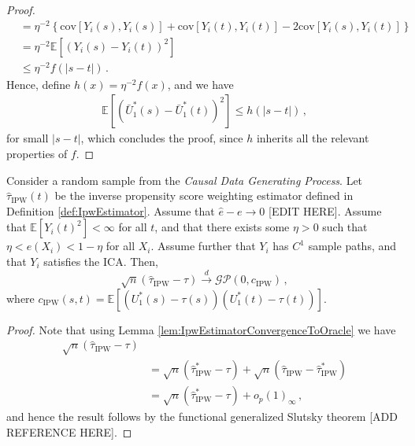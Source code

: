 \begin{proof}
\begin{align}
        &= \eta^{-2} \left\{ \mathrm{cov}[Y_i(s), Y_i(s)] + \mathrm{cov}[Y_i(t), Y_i(t)] - 2 \mathrm{cov}[Y_i(s), Y_i(t)] \right\} \\
        &= \eta^{-2} \mathbb{E}\left[(Y_i(s) - Y_i(t))^2\right] \\
        &\leq \eta^{-2} f(|s - t|) \,.
    \end{align}
    Hence, define $h(x) = \eta^{-2} f(x)$, and we have
    \begin{align}
        \mathbb{E}[(\bar{U}_1^\ast(s) - \bar{U}_1^\ast(t))^2] \leq h(|s - t|) \,,
    \end{align}
    for small $|s-t|$, which concludes the proof, since $h$ inherits all the relevant properties of
    $f$.

\end{proof}


\begin{theorem}
    Consider a random sample from the \emph{Causal Data Generating Process}. Let
    $\hat{\tau}_{\text{IPW}}(t)$ be the inverse propensity score weighting estimator defined in
    Definition \ref{def:IpwEstimator}. Assume that $\hat{e} - e \to 0$ [EDIT HERE]. Assume that
    $\mathbb{E}[Y_i(t)^2] < \infty$ for all $t$, and that there exists some $\eta > 0$ such that
    $\eta < e(X_i) < 1 - \eta$ for all $X_i$. Assume further that $Y_i$ has $C^1$ sample paths, and
    that $Y_i$ satisfies the ICA. Then,
    \[
        \sqrt{n} \left( \hat{\tau}_{\text{IPW}} - \tau \right)
        \overset{d}{\to} \mathcal{GP}\left(0, c_{\text{IPW}}\right) \,,
    \]
    where $c_{\text{IPW}}(s, t) = \mathbb{E}[(U_1^\ast(s) - \tau(s))(U_1^\ast(t) - \tau(t))]$.

\end{theorem}
\begin{proof}
    Note that using Lemma \ref{lem:IpwEstimatorConvergenceToOracle} we have
    \begin{align}
        \sqrt{n} \left( \hat{\tau}_{\text{IPW}} - \tau \right) \\
        &= \sqrt{n} \left( \hat{\tau}_{\text{IPW}}^\ast - \tau \right) + \sqrt{n} \left(
        \hat{\tau}_{\text{IPW}} - \hat{\tau}_{\text{IPW}}^\ast \right) \\
        &= \sqrt{n} \left( \hat{\tau}_{\text{IPW}}^\ast - \tau \right) + o_p(1)_\infty \,,
    \end{align}
    and hence the result follows by the functional generalized Slutsky theorem [ADD REFERENCE HERE].
\end{proof}


